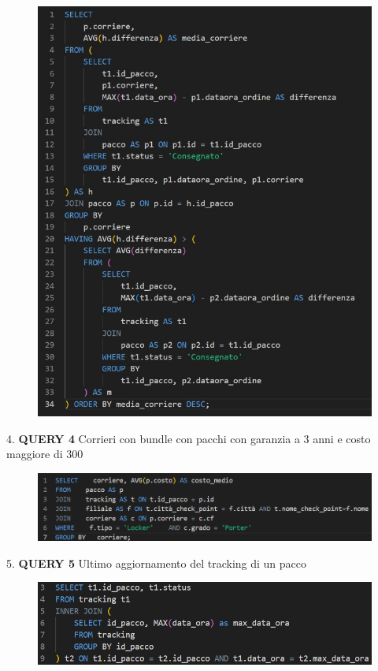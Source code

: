 \begin{figure}[H]
\centering
\includegraphics[width=1 \textwidth]{Resources/QUERY3.png}
\label{ML}
\end{figure}
4. \textbf{QUERY 4} Corrieri con bundle con pacchi con garanzia a 3 anni e costo maggiore di 300
\begin{figure}[H]
\centering
\includegraphics[width=1 \textwidth]{Resources/QUERY4.png}
\label{ML}
\end{figure} 
5. \textbf{QUERY 5} Ultimo aggiornamento del tracking di un pacco
\begin{figure}[H]
\centering
\includegraphics[width=1 \textwidth]{Resources/QUERY5.png}
\label{ML}
\end{figure}

